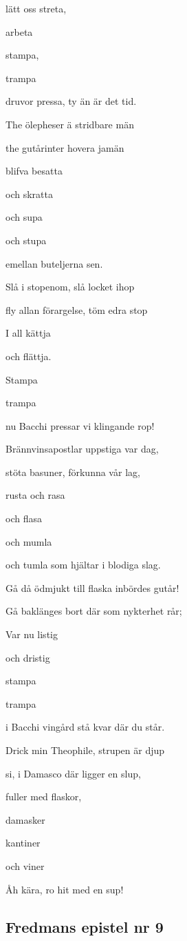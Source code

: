 lätt oss streta,

arbeta

stampa,

trampa

druvor pressa, ty än är det tid.

The ölepheser ä stridbare män

the gutårinter hovera jamän

blifva besatta

och skratta

och supa

och stupa

emellan buteljerna sen. \bigskip



Slå i stopenom, slå locket ihop

fly allan förargelse, töm edra stop

I all kättja

och flättja.

Stampa

trampa\bigskip



nu Bacchi pressar vi klingande rop!

Brännvinsapostlar uppstiga var dag,

stöta basuner, förkunna vår lag,

rusta och rasa

och flasa

och mumla

och tumla som hjältar i blodiga slag.

Gå då ödmjukt till flaska inbördes gutår!

Gå baklänges bort där som nykterhet rår;

Var nu listig

och dristig

stampa

trampa

i Bacchi vingård stå kvar där du står.

Drick min Theophile, strupen är djup

si, i Damasco där ligger en slup,

fuller med flaskor,

damasker

kantiner

och viner

Åh kära, ro hit med en sup! \bigskip

\subsection{\textbf{Fredmans epistel nr 9 }}

